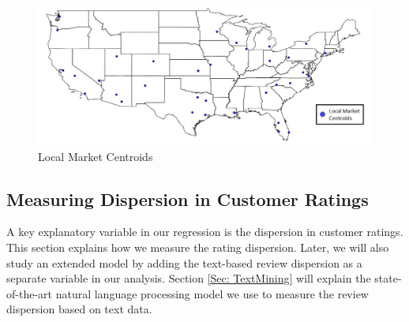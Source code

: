 \documentclass[msom,blindrev]{informs3}
\begin{document}
	
	
	
	
	
	
	
	\begin{figure}
		\centering
		\includegraphics[width=1\linewidth]{markets.jpg}
		\caption{Local Market Centroids}
		\label{fig: markets}
	\end{figure}
	
	\subsection{Measuring Dispersion in Customer Ratings} \label{Subsec: Measure Dispersion}
	
	A key explanatory variable in our regression is the dispersion in customer ratings. This section explains how we measure the rating dispersion. Later, we will also study an extended model by adding the text-based review dispersion as a separate variable in our analysis.  Section \ref{Sec: TextMining} will explain the state-of-the-art natural language processing model we use to measure the review dispersion based on text data.
	
	
\end{document}
